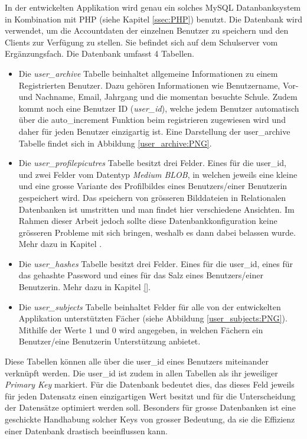 \documentclass[a4paper,11pt]{report}
\begin{document}
				In der entwickelten Applikation wird genau ein solches MySQL Datanbanksystem in Kombination mit PHP (siehe Kapitel \ref{ssec:PHP}) benutzt. Die Datenbank wird verwendet, um die Accountdaten der einzelnen Benutzer zu speichern und den Clients zur Verfügung zu stellen. Sie befindet sich auf dem Schulserver vom Ergänzungsfach. Die Datenbank umfasst 4 Tabellen.
				
				\begin{itemize}
					\item Die \emph{user\_archive} Tabelle beinhaltet allgemeine Informationen zu einem Registrierten Benutzer. Dazu gehören Informationen wie Benutzername, Vor- und Nachname, Email, Jahrgang und die momentan besuchte Schule. Zudem kommt noch eine Benutzer ID (\emph{user\_id}), welche jedem Benutzer automatisch über die auto\_increment Funktion beim registrieren zugewiesen wird und daher für jeden Benutzer einzigartig ist. Eine Darstellung der user\_archive Tabelle findet sich in Abbildung \ref{user_archive:PNG}.
					\item Die \emph{user\_profilepicutres} Tabelle besitzt drei Felder. Eines für die user\_id, und zwei Felder vom Datentyp \emph{Medium BLOB}, in welchen jeweils eine kleine und eine grosse Variante des Profilbildes eines Benutzers/einer Benutzerin gespeichert wird. Das speichern von grösseren Bilddateien in Relationalen Datenbanken ist umstritten und man findet hier verschiedene Ansichten. Im Rahmen dieser Arbeit jedoch sollte diese Datenbankkonfiguration keine grösseren Probleme mit sich bringen, weshalb es dann dabei belassen wurde. Mehr dazu in Kapitel \real{}.
					\item Die \emph{user\_hashes} Tabelle besitzt drei Felder. Eines für die user\_id, eines für das gehashte Password und eines für das Salz eines Benutzers/einer Benutzerin. Mehr dazu in Kapitel \ref{}.
					\item Die \emph{user\_subjects} Tabelle beinhaltet Felder für alle von der entwickelten Applikation unterstützten Fächer (siehe Abbildung \ref{user_subjects:PNG}). Mithilfe der Werte 1 und 0 wird angegeben, in welchen Fächern ein Benutzer/eine Benutzerin Unterstützung anbietet.
				\end{itemize}
			
				
				Diese Tabellen können alle über die user\_id eines Benutzers miteinander verknüpft werden. Die user\_id ist zudem in allen Tabellen als ihr jeweiliger \emph{Primary Key} markiert. Für die Datenbank bedeutet dies, das dieses Feld jeweils für jeden Datensatz einen einzigartigen Wert besitzt und für die Unterscheidung der Datensätze optimiert werden soll. Besonders für grosse Datenbanken ist eine geschickte Handhabung solcher Keys von grosser Bedeutung, da sie die Effizienz einer Datenbank drastisch beeinflussen kann.
				
\end{document}
